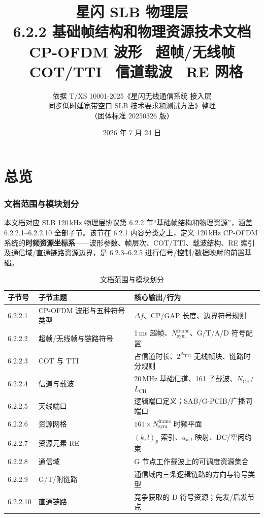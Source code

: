 \documentclass[11pt,a4paper]{ctexart}
\title{%
  \textbf{星闪 SLB 物理层}\\[0.4em]
  \Large 6.2.2 基础帧结构和物理资源技术文档\\[0.3em]
  \large CP-OFDM 波形 \textbullet\ 超帧/无线帧 \textbullet\ COT/TTI \textbullet\ 信道载波 \textbullet\ RE 网格
}
\author{依据 T/XS 10001-2025《星闪无线通信系统 接入层\\
同步低时延宽带空口 SLB 技术要求和测试方法》整理\\
（团体标准 20250326 版）}
\date{2026 年 7 月 24 日}
\begin{document}
\maketitle
\tableofcontents
\newpage

\part{总览}

\section{文档范围与模块划分}

本文档对应 SLB 120\,kHz 物理层协议第 6.2.2 节``基础帧结构和物理资源''，涵盖 6.2.2.1\textasciitilde 6.2.2.10 全部子节。该节在 6.2.1 内容分类之上，定义 120\,kHz CP-OFDM 系统的\textbf{时频资源坐标系}——波形参数、帧层次、COT/TTI、载波结构、RE 索引及通信域/直通链路资源边界，是 6.2.3\textasciitilde 6.2.5 进行信号/控制/数据映射的前置基础。

\begin{longtable}{L{2.2cm}L{4.8cm}L{6.5cm}}
\caption{文档范围与模块划分} \\
\toprule
\textbf{子节号} & \textbf{子节主题} & \textbf{核心输出/行为} \\
.2.1 & CP-OFDM 波形与五种符号类型 & $\Delta f$、CP/GAP 长度、边界符号规则 \\
6.2.2.2 & 超帧/无线帧与链路符号 & 1\,ms 超帧、$N_{\mathrm{sym}}^{\mathrm{frame}}$、G/T/A/D 符号配置 \\
6.2.2.3 & COT 与 TTI & 占信道时长、$2^{N_{\mathrm{TTI}}}$ 无线帧块、链路时分规则 \\
6.2.2.4 & 信道与载波 & 20\,MHz 基础信道、161 子载波、$N_{\mathrm{CH}}$/$L_{\mathrm{CH}}$ \\
6.2.2.5 & 天线端口 & 逻辑端口定义；SAB/G-PCIB/广播同端口 \\
6.2.2.6 & 资源网格 & $161 \times N_{\mathrm{sym}}^{\mathrm{frame}}$ 时频平面 \\
6.2.2.7 & 资源元素 RE & $(k,l)_p$ 索引、$a_{k,l}$ 映射、DC/空闲约束 \\
6.2.2.8 & 通信域 & G 节点工作载波上的可调度资源集合 \\
6.2.2.9 & G/T/附链路 & 通信域内三条逻辑链路的方向与符号类型 \\
6.2.2.10 & 直通链路 & 竞争获取的 D 符号资源；先发/后发节点 \\
\bottomrule
\end{longtable}
\end{document}
